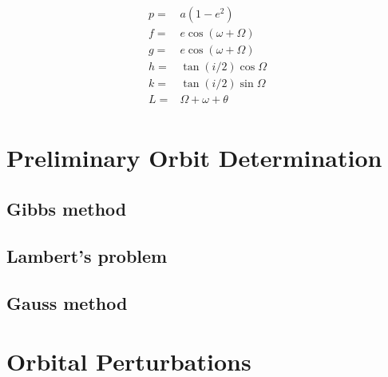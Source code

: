 \begin{equation}
    \begin{aligned}
        p=&a(1-e^2)\\
        f=&e\cos{(\omega+\Omega)}\\
        g=&e\cos{(\omega+\Omega)}\\
        h=&\tan{(i/2)}\cos{\Omega}\\
        k=&\tan{(i/2)}\sin{\Omega}\\
        L=&\Omega+\omega+\theta\\
    \end{aligned}
\end{equation}

\cite{Equinoctial}

\section{Preliminary Orbit Determination}

\subsection{Gibbs method}

\subsection{Lambert's problem}

\subsection{Gauss method}

\newpage\section{Orbital Perturbations}

